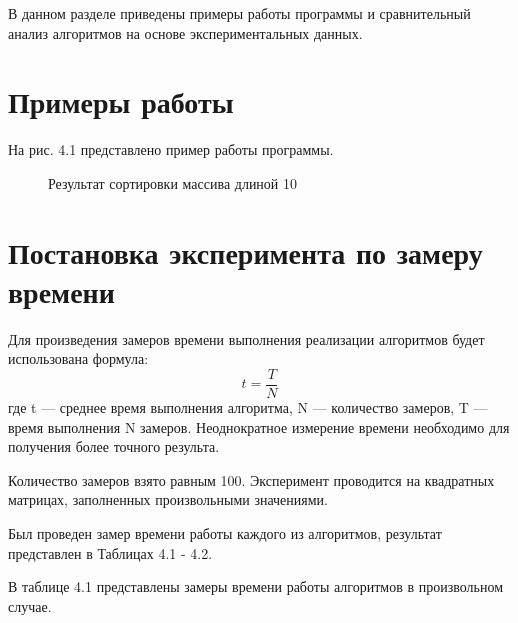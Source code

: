 \documentclass[12pt]{report}
\begin{document}
В данном разделе приведены примеры работы программы и сравнительный анализ алгоритмов на основе экспериментальных данных. 

\section{Примеры работы} 
 
На рис. 4.1 представлено пример работы программы. 

\begin{figure}[h]
	\caption{Результат сортировки массива длиной 10}
	\label{figure:image}
\end{figure}

\newpage
\section{Постановка эксперимента по замеру времени}

Для произведения замеров времени выполнения реализации алгоритмов будет использована формула: \begin{equation}\label{eq:fourierrow}
	t = \frac{T}{N}
\end{equation}
где t — среднее время выполнения алгоритма, N — количество замеров, T — время выполнения N замеров.  
Неоднократное измерение времени необходимо для получения более точного результа.  
 
 Количество замеров взято равным 100. Эксперимент проводится на квадратных матрицах, заполненных произвольными значениями.
 
 Был проведен замер времени работы каждого из алгоритмов, результат представлен в Таблицах 4.1 - 4.2. \vspace{\baselineskip}
 
В таблице 4.1 представлены замеры времени работы алгоритмов в произвольном случае.
\end{document}
